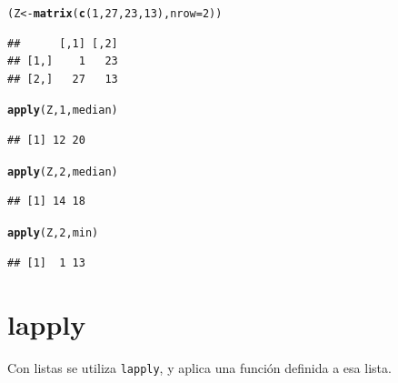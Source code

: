 \documentclass{config/apuntes}\usepackage[]{graphicx}\usepackage[]{xcolor}
\makeatletter
\newcommand{\hlnum}[1]{\textcolor[rgb]{0.686,0.059,0.569}{#1}}%
\newcommand{\hldef}[1]{\textcolor[rgb]{0.345,0.345,0.345}{#1}}%
\newcommand{\hlkwb}[1]{\textcolor[rgb]{0.69,0.353,0.396}{#1}}%
\newcommand{\hlkwc}[1]{\textcolor[rgb]{0.333,0.667,0.333}{#1}}%
\newcommand{\hlkwd}[1]{\textcolor[rgb]{0.737,0.353,0.396}{\textbf{#1}}}%
\newenvironment{kframe}{%
 \def\at@end@of@kframe{}%
 \ifinner\ifhmode%
  \def\at@end@of@kframe{\end{minipage}}%
  \begin{minipage}{\columnwidth}%
 \fi\fi%
 \def\FrameCommand##1{\hskip\@totalleftmargin \hskip-\fboxsep
 \colorbox{shadecolor}{##1}\hskip-\fboxsep
     \hskip-\linewidth \hskip-\@totalleftmargin \hskip\columnwidth}%
 \MakeFramed {\advance\hsize-\width
   \@totalleftmargin\z@ \linewidth\hsize
   \@setminipage}}%
 {\par\unskip\endMakeFramed%
 \at@end@of@kframe}
\newenvironment{knitrout}{}{} %
\newcommand{\code}[1]{\texttt{#1}}
\makeatother
\begin{document}
\begin{knitrout}
\color{fgcolor}\begin{kframe}
\begin{alltt}
\hldef{(Z} \hlkwb{<-} \hlkwd{matrix}\hldef{(}\hlkwd{c}\hldef{(}\hlnum{1}\hldef{,} \hlnum{27}\hldef{,} \hlnum{23}\hldef{,} \hlnum{13}\hldef{),} \hlkwc{nrow} \hldef{=} \hlnum{2}\hldef{))}
\end{alltt}
\begin{verbatim}
##      [,1] [,2]
## [1,]    1   23
## [2,]   27   13
\end{verbatim}
\begin{alltt}
\hlkwd{apply}\hldef{(Z,} \hlnum{1}\hldef{, median)}
\end{alltt}
\begin{verbatim}
## [1] 12 20
\end{verbatim}
\begin{alltt}
\hlkwd{apply}\hldef{(Z,} \hlnum{2}\hldef{, median)}
\end{alltt}
\begin{verbatim}
## [1] 14 18
\end{verbatim}
\begin{alltt}
\hlkwd{apply}\hldef{(Z,} \hlnum{2}\hldef{, min)}
\end{alltt}
\begin{verbatim}
## [1]  1 13
\end{verbatim}
\end{kframe}
\end{knitrout}

\section{lapply}
Con listas se utiliza \code{lapply}, y aplica una función definida a esa lista. 
\end{document}
